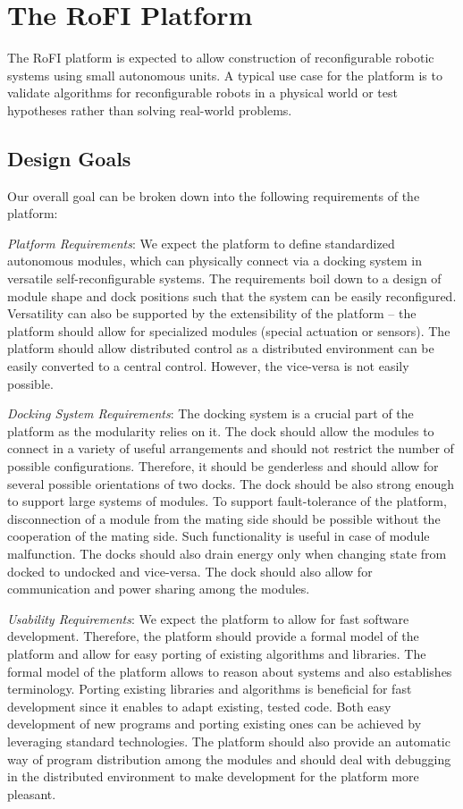 \chapter{The RoFI Platform}\label{chap:rofi}

The RoFI platform is expected to allow construction of reconfigurable robotic
systems using small autonomous units. A typical use case for the platform is to
validate algorithms for reconfigurable robots in a physical world or test
hypotheses rather than solving real-world problems.

\section{Design Goals}\label{sec:design_goals}

Our overall goal can be broken down into the following requirements of the
platform:

\emph{Platform Requirements}: We expect the platform to define standardized
autonomous modules, which can physically connect via a docking system in
versatile self-reconfigurable systems. The requirements boil down to a design of
module shape and dock positions such that the system can be easily reconfigured.
Versatility can also be supported by the extensibility of the platform -- the
platform should allow for specialized modules (special actuation or sensors).
The platform should allow distributed control as a distributed environment can
be easily converted to a central control. However, the vice-versa is not easily
possible.

\emph{Docking System Requirements}: The docking system is a crucial part of the
platform as the modularity relies on it. The dock should allow the modules to
connect in a variety of useful arrangements and should not restrict the number
of possible configurations. Therefore, it should be genderless and should allow
for several possible orientations of two docks. The dock should be also strong
enough to support large systems of modules. To support fault-tolerance of the
platform, disconnection of a module from the mating side should be possible
without the cooperation of the mating side. Such functionality is useful in case
of module malfunction. The docks should also drain energy only when changing
state from docked to undocked and vice-versa. The dock should also allow for
communication and power sharing among the modules.

\emph{Usability Requirements}: We expect the platform to allow for fast software
development. Therefore, the platform should provide a formal model of the
platform and allow for easy porting of existing algorithms and libraries. The
formal model of the platform allows to reason about systems and also establishes
terminology. Porting existing libraries and algorithms is beneficial for fast
development since it enables to adapt existing, tested code. Both easy
development of new programs and porting existing ones can be achieved by
leveraging standard technologies. The platform should also provide an automatic
way of program distribution among the modules and should deal with debugging in
the distributed environment to make development for the platform more pleasant.

